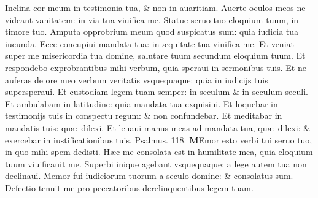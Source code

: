 \documentclass[a5paper,10pt]{book}
\def\ae{æ}
\begin{document}
\begin{multicols*}{2}
\newline \color{red} I\color{black}nclina cor meum in testimonia tua, \& non in auaritiam.
\newline \color{red} A\color{black}uerte oculos meos ne videant vanitatem: in via tua viuifica me.
\newline \color{red} S\color{black}tatue seruo tuo eloquium tuum, in timore tuo.
\newline \color{red} A\color{black}mputa opprobrium meum quod suspicatus sum: quia iudicia tua iucunda.
\newline \color{red} E\color{black}cce concupiui mandata tua: in \ae quitate tua viuifica me.
\newline \color{red} E\color{black}t veniat super me misericordia tua domine, salutare tuum secundum eloquium tuum.
\newline \color{red} E\color{black}t respondebo exprobrantibus mihi verbum, quia speraui in sermonibus tuis.
\newline \color{red} E\color{black}t ne auferas de ore meo verbum veritatis vsquequaque: quia in iudicijs tuis supersperaui.
\newline \color{red} E\color{black}t custodiam legem tuam semper: in seculum \& in seculum seculi.
\newline \color{red} E\color{black}t ambulabam in latitudine: quia mandata tua exquisiui.
\newline \color{red} E\color{black}t loquebar in testimonijs tuis in conspectu regum: \& non confundebar.
\newline \color{red} E\color{black}t meditabar in mandatis tuis: qu\ae \ dilexi.
\newline \color{red} E\color{black}t leuaui manus meas ad mandata tua, qu\ae \ dilexi: \& exercebar in iustificationibus tuis. \quad \color{red} Psalmus. \hypertarget{ps118.4}{118.} \color{black}
\vspace{-1em}
\lettrine[lines=2]{\bfseries \color{red} M}{}Emor esto verbi tui seruo tuo, in quo mihi spem dedisti.
\newline \color{red} H\color{black}\ae c me consolata est in humilitate mea, quia eloquium tuum viuificauit me.
\newline \color{red} S\color{black}uperbi inique agebant vsquequaque: a lege autem tua non declinaui.
\newline \color{red} M\color{black}emor fui iudiciorum tuorum a seculo domine: \& consolatus sum.
\newline \color{red} D\color{black}efectio tenuit me pro peccatoribus derelinquentibus legem tuam.

\end{multicols*}
\end{document}
